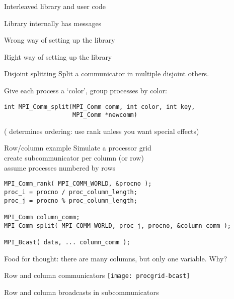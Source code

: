 \begin{numberedframe}{Interleaved library and user code}
\end{numberedframe}
\begin{numberedframe}{Library internally has messages}
\end{numberedframe}
\begin{numberedframe}{Wrong way of setting up the library}
\end{numberedframe}

\begin{numberedframe}{Right way of setting up the library}
\end{numberedframe}

\begin{numberedframe}{Disjoint splitting}
  Split a communicator in multiple disjoint others.
  
Give each process a `color', group processes by color:
\lstset{language=C}
\begin{lstlisting}
int MPI_Comm_split(MPI_Comm comm, int color, int key, 
                   MPI_Comm *newcomm)  
\end{lstlisting}
( determines ordering: use rank unless you want special effects)
\end{numberedframe}

\begin{numberedframe}{Row/column example}
  Simulate a processor grid\\
  create subcommunicator per column (or row)\\
  assume processes numbered by rows
\begin{lstlisting}
MPI_Comm_rank( MPI_COMM_WORLD, &procno );
proc_i = procno / proc_column_length;
proc_j = procno % proc_column_length;

MPI_Comm column_comm;
MPI_Comm_split( MPI_COMM_WORLD, proc_j, procno, &column_comm );

MPI_Bcast( data, ... column_comm );
\end{lstlisting}
Food for thought: there are many columns,
but only one  variable. Why?
\end{numberedframe}

\begin{numberedframe}{Row and column communicators}
  \texttt{[image: procgrid-bcast]}

  Row and column broadcasts in subcommunicators
\end{numberedframe}

